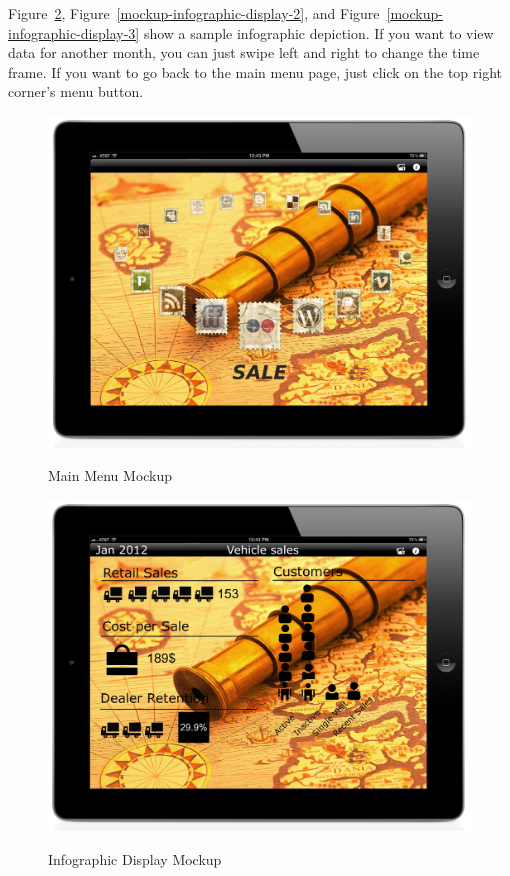 \documentclass[11pt,a4paper,oneside]{article}
\begin{document}
Figure~\ref{mockup-infographic-display-1}, Figure~\ref{mockup-infographic-display-2}, and Figure~\ref{mockup-infographic-display-3} show a sample infographic depiction.  If you want to view data for another month, you can just swipe left and right to change the time frame.  If you want to go back to the main menu page, just click on the top right corner’s menu button.\\


\begin{figure}[!]
\caption{Main Menu Mockup\label{mockup-main-menu}}
\includegraphics[width=1\textwidth]{images/screen.jpg}\\
\end{figure}


\begin{figure}[!]
\caption{Infographic Display Mockup\label{mockup-infographic-display-1}}
\includegraphics[width=1\textwidth]{images/screen5.jpg}\\
\end{figure}
\end{document}
